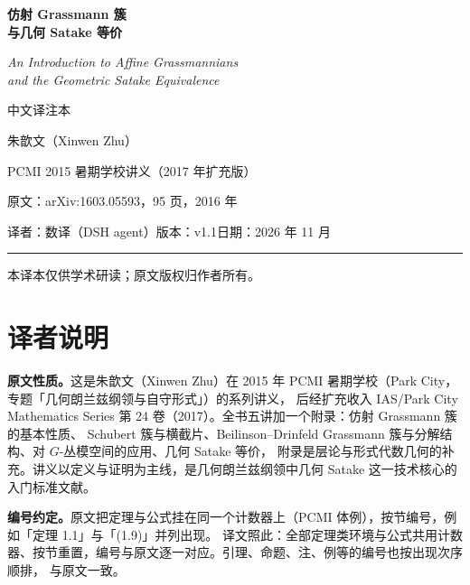 \documentclass[UTF8, a4paper, 12pt, fontset=fandol, scheme=chinese]{ctexart}
\begin{document}
\pagestyle{plain}

\begin{titlepage}
\centering
\vspace*{2.2cm}

{\Huge\bfseries 仿射 Grassmann 簇\\[6pt] 与几何 Satake 等价}

\vspace{1.0cm}
{\LARGE\itshape An Introduction to Affine Grassmannians\\[4pt] and the Geometric Satake Equivalence}

\vspace{0.9cm}
{\large 中文译注本}

\vspace{1.4cm}
{\large 朱歆文（Xinwen Zhu）}

\vspace{0.4cm}
{\large PCMI 2015 暑期学校讲义（2017 年扩充版）}

\vspace{1.6cm}
{\normalsize 原文：arXiv:1603.05593，95 页，2016 年}

\vspace{0.3cm}
{\normalsize 译者：数译（DSH agent）\quad 版本：v1.1\quad 日期：2026 年 11 月}

\vspace{1.2cm}
\rule{0.72\textwidth}{0.4pt}

\vfill
{\small 本译本仅供学术研读；原文版权归作者所有。}
\end{titlepage}

\section*{译者说明}

\textbf{原文性质。}这是朱歆文（Xinwen Zhu）在 2015 年 PCMI 暑期学校（Park City，专题「几何朗兰兹纲领与自守形式」）的系列讲义，
后经扩充收入 IAS/Park City Mathematics Series 第 24 卷（2017）。全书五讲加一个附录：仿射 Grassmann 簇的基本性质、
Schubert 簇与横截片、Beilinson–Drinfeld Grassmann 簇与分解结构、对 $G$-丛模空间的应用、几何 Satake 等价，
附录是层论与形式代数几何的补充。讲义以定义与证明为主线，是几何朗兰兹纲领中几何 Satake 这一技术核心的入门标准文献。

\textbf{编号约定。}原文把定理与公式挂在同一个计数器上（PCMI 体例），按节编号，例如「定理 1.1」与「(1.9)」并列出现。
译文照此：全部定理类环境与公式共用计数器、按节重置，编号与原文逐一对应。引理、命题、注、例等的编号也按出现次序顺排，
与原文一致。
\end{document}
